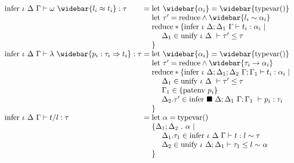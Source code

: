\documentclass[sigplan,screen]{acmart}
\begin{document}
\begin{figure*}[h]
\[\begin{array}{l @{} l}
      \text{infer } \iota\ \Delta\ \Gamma \vdash 
      \omega\ \widebar{l_i \approx t_i} : \tau
      &{} =
      \begin{array}[t]{@{} l}
        \text{let } \widebar{\alpha_i} = \widebar{\text{typevar}()}
        \\
        \text{let } \tau' = \text{reduce} \wedge \widebar{l_i \sim \alpha_i}
        \\
        \text{reduce} * \{
        \text{infer } \iota\ \Delta;\Delta_1\ \Gamma \vdash t_i : \alpha_i\ |\ 
        \\
        \ \ \ \ \Delta_1 \in \text{unify } \iota\ \Delta\ \vdash \tau' \leq \tau
        \\
        \}
        \\
      \end{array}
      \\

      \text{infer } \iota\ \Delta\ \Gamma \vdash 
      \lambda\ \widebar{p_i : \tau_i \Rightarrow t_i} : \tau
      &{} =
      \begin{array}[t]{@{} l}
        \text{let } \widebar{\alpha_i} = \widebar{\text{typevar}()}
        \\
        \text{let } \tau' = \text{reduce} \wedge 
        \widebar{\tau_i \rightarrow \alpha_i }
        \\
        \text{reduce} * \{
        \text{infer } \iota\ \Delta;\Delta_1;\Delta_2\ \Gamma;\Gamma_1 \vdash t_i : \alpha_i\ |\ 
        \\
        \ \ \ \ \Delta_1 \in \text{unify } \iota\ \Delta\ \vdash \tau' \leq \tau
        \\
        \ \ \ \ \Gamma_1 \in \{\text{patenv } p_i\}
        \\
        \ \ \ \ \Delta_2.\tau' \in \text{infer } \blacksquare\ \Delta;\Delta_1\ \Gamma;\Gamma_1\ \vdash p_i : \tau_i
        \\
        \}
        \\
      \end{array}
      \\

      \text{infer } \iota\ \Delta\ \Gamma \vdash 
      t/l : \tau
      &{} =
      \begin{array}[t]{@{} l}
        \text{let } \alpha = \text{typevar}()
        \\
        \{ \Delta_1;\Delta_2\ .\ \alpha \ |\
        \\
        \ \ \ \ \Delta_1.\tau_1 \in \text{infer } \iota\ \Delta\ \Gamma \vdash t : l \sim \tau 
        \\
        \ \ \ \ \Delta_2 \in \text{unify } \iota\ \Delta;\Delta_1 \vdash \tau_1 \leq l \sim \alpha
        \\
        \}
      \end{array}
      \\


\end{array}\]
\end{figure*}
\end{document}
